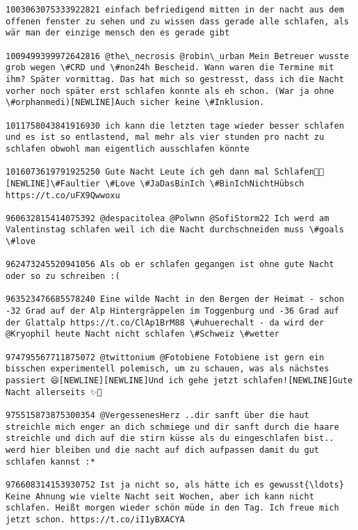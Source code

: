 \documentclass[11pt]{article}
\begin{document}
    \begin{Verbatim}[commandchars=\\\{\}]
1003063075333922821 einfach befriedigend mitten in der nacht aus dem offenen fenster zu sehen und zu wissen dass gerade alle schlafen, als wär man der einzige mensch den es gerade gibt 

1009499399972642816 @the\_necrosis @robin\_urban Mein Betreuer wusste grob wegen \#CRD und \#non24h Bescheid. Wann waren die Termine mit ihm? Später vormittag. Das hat mich so gestresst, dass ich die Nacht vorher noch später erst schlafen konnte als eh schon. (War ja ohne \#orphanmedi)[NEWLINE]Auch sicher keine \#Inklusion. 

1011758043841916930 ich kann die letzten tage wieder besser schlafen und es ist so entlastend, mal mehr als vier stunden pro nacht zu schlafen obwohl man eigentlich ausschlafen könnte 

1016073619791925250 Gute Nacht Leute ich geh dann mal Schlafen👋🏻[NEWLINE]\#Faultier \#Love \#JaDasBinIch \#BinIchNichtHübsch https://t.co/uFX9Qwwoxu 

960632815414075392 @despacitolea @Polwnn @SofiStorm22 Ich werd am Valentinstag schlafen weil ich die Nacht durchschneiden muss \#goals \#love 

962473245520941056 Als ob er schlafen gegangen ist ohne gute Nacht oder so zu schreiben :( 

963523476685578240 Eine wilde Nacht in den Bergen der Heimat - schon -32 Grad auf der Alp Hintergräppelen im Toggenburg und -36 Grad auf der Glattalp https://t.co/ClAp1BrM88 \#uhuerechalt - da wird der @Kryophil heute Nacht nicht schlafen \#Schweiz \#wetter 

974795567711875072 @twittonium @Fotobiene Fotobiene ist gern ein bisschen experimentell polemisch, um zu schauen, was als nächstes passiert 😄[NEWLINE][NEWLINE]Und ich gehe jetzt schlafen![NEWLINE]Gute Nacht allerseits ✨🌙 

975515873875300354 @VergessenesHerz ..dir sanft über die haut streichle mich enger an dich schmiege und dir sanft durch die haare streichle und dich auf die stirn küsse als du eingeschlafen bist.. werd hier bleiben und die nacht auf dich aufpassen damit du gut schlafen kannst :* 

976608314153930752 Ist ja nicht so, als hätte ich es gewusst{\ldots} Keine Ahnung wie vielte Nacht seit Wochen, aber ich kann nicht schlafen. Heißt morgen wieder schön müde in den Tag. Ich freue mich jetzt schon. https://t.co/iI1yBXACYA 


\end{Verbatim}
\end{document}

